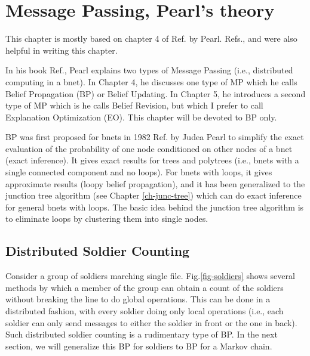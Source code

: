 \chapter{Message Passing, Pearl's theory}
\label{ch-mpass}

This chapter is mostly
based on chapter 4 of 
Ref.\cite{pearl-1988book}
by Pearl.
Refs.\cite{wiki-mp},
and \cite{neapolitan2004learning}
were also helpful in writing this chapter.

In his book Ref.\cite{pearl-1988book},
Pearl explains two types 
of Message Passing (i.e., distributed 
computing in a bnet). In Chapter 4, he discusses
one type of MP which he calls Belief Propagation (BP)
or Belief Updating. In Chapter 5, he introduces
a second type of MP which is he calls Belief Revision, but
which I prefer to call
Explanation Optimization (EO).
This chapter will be devoted to BP only.


BP
was first proposed for bnets in 1982
Ref.\cite{pearl1982reverend} by Judea Pearl
to simplify
the exact evaluation of the probability
of one node conditioned 
on other nodes
of a bnet (exact inference).
It gives exact results for trees and
polytrees (i.e., bnets with
a single connected component and
 no
loops). For bnets with loops,
it gives approximate results
(loopy belief propagation),
and it has been generalized to
the junction tree algorithm
(see Chapter \ref{ch-junc-tree})
which can do exact inference
for general bnets with loops.
The basic idea behind
the junction tree algorithm
is to eliminate
loops by clustering
them into single nodes.



\section{Distributed Soldier Counting}
Consider
a group of soldiers marching single file.
Fig.\ref{fig-soldiers}
shows several methods by which 
a member of the group 
can obtain a count 
of the soldiers without
breaking the line to do 
global operations.
This can be done in
a distributed fashion, 
with every soldier doing
only local operations
(i.e.,
each soldier 
can only 
send
messages
to either
the soldier in front
or the one in
back).
Such 
distributed soldier counting is a rudimentary
type of BP.
In the next section,
we will
generalize this BP for soldiers
to BP for a Markov chain.
\newpage


